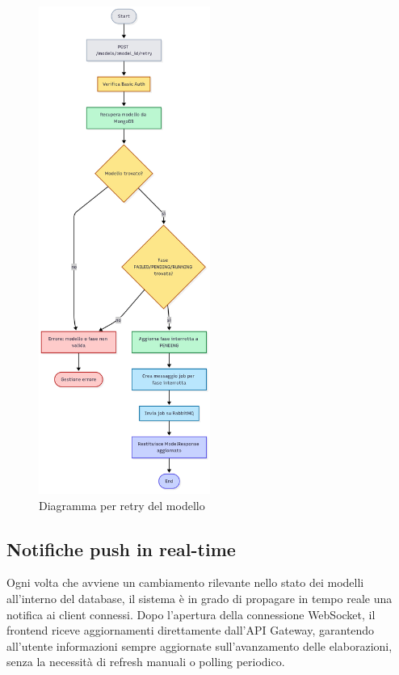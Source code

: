 \begin{figure}[p]
	\centering
	\includegraphics[width=0.5\textwidth]{images/retry_model_diagram.jpg}
	\caption{Diagramma per retry del modello}
	\label{fig:retry_diagram}
\end{figure}

\newpage
\subsection{Notifiche push in real-time}
Ogni volta che avviene un cambiamento rilevante nello stato dei modelli all’interno del database, il sistema è in grado di propagare in tempo reale una notifica ai client connessi. Dopo l’apertura della connessione WebSocket, il frontend riceve aggiornamenti direttamente dall’API Gateway, garantendo all’utente informazioni sempre aggiornate sull’avanzamento delle elaborazioni, senza la necessità di refresh manuali o polling periodico.

